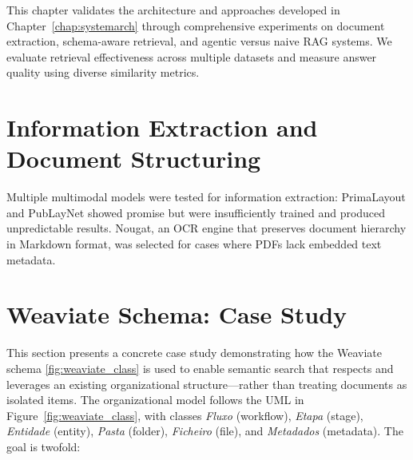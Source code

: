 \label{chap:results}

This chapter validates the architecture and approaches developed in Chapter~\ref{chap:systemarch} through comprehensive experiments on document extraction, schema-aware retrieval, and agentic versus naive \gls{RAG} systems. We evaluate retrieval effectiveness across multiple datasets and measure answer quality using diverse similarity metrics.

\section{Information Extraction and Document Structuring}

Multiple multimodal models were tested for information extraction: PrimaLayout and PubLayNet showed promise but were insufficiently trained and produced unpredictable results. Nougat, an OCR engine that preserves document hierarchy in Markdown format, was selected for cases where PDFs lack embedded text metadata.
\section{Weaviate Schema: Case Study}
\label{sec:schema_example_study}

This section presents a concrete case study demonstrating how the Weaviate schema \ref{fig:weaviate_class} is used to enable semantic search that respects and leverages an existing organizational structure—rather than treating documents as isolated items. The organizational model follows the UML in Figure~\ref{fig:weaviate_class}, with classes \textit{Fluxo} (workflow), \textit{Etapa} (stage), \textit{Entidade} (entity), \textit{Pasta} (folder), \textit{Ficheiro} (file), and \textit{Metadados} (metadata). The goal is twofold:

